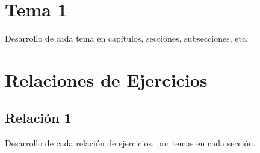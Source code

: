 \documentclass[12pt]{book}
\begin{document}

    
    
    \chapter{Tema 1}
    Desarrollo de cada tema en capítulos, secciones, subsecciones, etc.


    
    \fancyhead[R]{\helv \nouppercase{\rightmark}}
    \chapter{Relaciones de Ejercicios}

    \section{Relación 1}
    Desarrollo de cada relación de ejercicios, por temas en cada sección.
\end{document}
